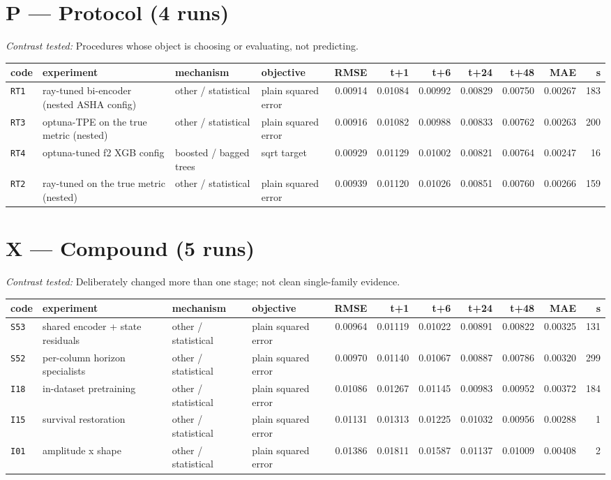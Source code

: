 \documentclass[9pt,landscape]{article}
\begin{document}
\section*{P --- Protocol (4 runs)}
\noindent\emph{Contrast tested:} Procedures whose object is choosing or evaluating, not predicting.\\
\vspace{2pt}
\begin{longtable}{@{}p{1.1cm}p{5.4cm}p{3.1cm}p{2.7cm}rrrrrrr@{}}
\toprule code & experiment & mechanism & objective & RMSE & t+1 & t+6 & t+24 & t+48 & MAE & s \\ \midrule \endhead
\texttt{RT1} & ray-tuned bi-encoder (nested ASHA config) & other / statistical & plain squared error & 0.00914 & 0.01084 & 0.00992 & 0.00829 & 0.00750 & 0.00267 & 183 \\
\texttt{RT3} & optuna-TPE on the true metric (nested) & other / statistical & plain squared error & 0.00916 & 0.01082 & 0.00988 & 0.00833 & 0.00762 & 0.00263 & 200 \\
\texttt{RT4} & optuna-tuned f2 XGB config & boosted / bagged trees & sqrt target & 0.00929 & 0.01129 & 0.01002 & 0.00821 & 0.00764 & 0.00247 & 16 \\
\texttt{RT2} & ray-tuned on the true metric (nested) & other / statistical & plain squared error & 0.00939 & 0.01120 & 0.01026 & 0.00851 & 0.00760 & 0.00266 & 159 \\
\bottomrule\end{longtable}

\section*{X --- Compound (5 runs)}
\noindent\emph{Contrast tested:} Deliberately changed more than one stage; not clean single-family evidence.\\
\vspace{2pt}
\begin{longtable}{@{}p{1.1cm}p{5.4cm}p{3.1cm}p{2.7cm}rrrrrrr@{}}
\toprule code & experiment & mechanism & objective & RMSE & t+1 & t+6 & t+24 & t+48 & MAE & s \\ \midrule \endhead
\texttt{S53} & shared encoder + state residuals & other / statistical & plain squared error & 0.00964 & 0.01119 & 0.01022 & 0.00891 & 0.00822 & 0.00325 & 131 \\
\texttt{S52} & per-column horizon specialists & other / statistical & plain squared error & 0.00970 & 0.01140 & 0.01067 & 0.00887 & 0.00786 & 0.00320 & 299 \\
\texttt{I18} & in-dataset pretraining & other / statistical & plain squared error & 0.01086 & 0.01267 & 0.01145 & 0.00983 & 0.00952 & 0.00372 & 184 \\
\texttt{I15} & survival restoration & other / statistical & plain squared error & 0.01131 & 0.01313 & 0.01225 & 0.01032 & 0.00956 & 0.00288 & 1 \\
\texttt{I01} & amplitude x shape & other / statistical & plain squared error & 0.01386 & 0.01811 & 0.01587 & 0.01137 & 0.01009 & 0.00408 & 2 \\
\bottomrule\end{longtable}
\end{document}
